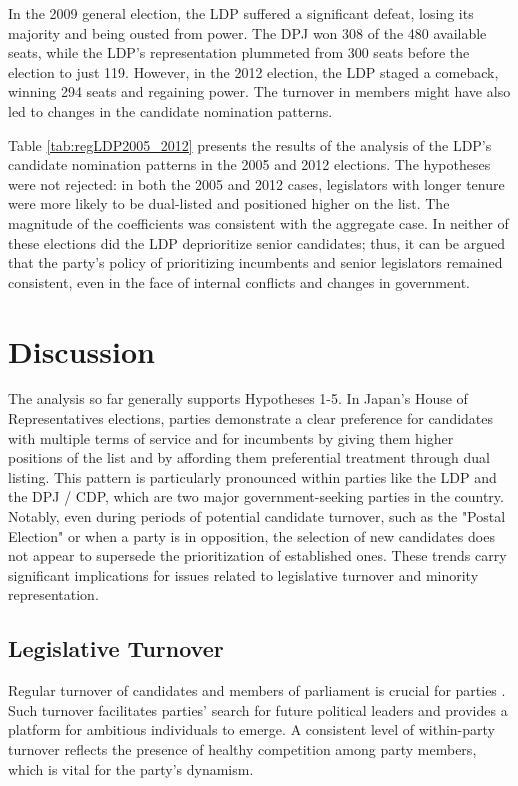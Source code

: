 \documentclass[a4paper, 11pt]{article}
\begin{document}
In the 2009 general election, the LDP suffered a significant defeat, losing its majority and being ousted from power.  The DPJ won 308 of the 480 available seats, while the LDP’s representation plummeted from 300 seats before the election to just 119. However, in the 2012 election, the LDP staged a comeback, winning 294 seats and regaining power. The turnover in members might have also led to changes in the candidate nomination patterns. 

Table \ref{tab:regLDP2005_2012} presents the results of the analysis of the LDP’s candidate nomination patterns in the 2005 and 2012 elections. The hypotheses were not rejected: in both the 2005 and 2012 cases, legislators with longer tenure were more likely to be dual-listed and positioned higher on the list. The magnitude of the coefficients was consistent with the aggregate case. In neither of these elections did the LDP deprioritize senior candidates; thus, it can be argued that the party's policy of prioritizing incumbents and senior legislators remained consistent, even in the face of internal conflicts and changes in government.



\section{Discussion} \label{sec: dis}

The analysis so far generally supports Hypotheses 1-5. In Japan's House of Representatives elections, parties demonstrate a clear preference for candidates with multiple terms of service and for incumbents by giving them higher positions of the list and by affording them preferential treatment through dual listing. This pattern is particularly pronounced within parties like the LDP and the DPJ / CDP, which are two major government-seeking parties in the country. Notably, even during periods of potential candidate turnover, such as the "Postal Election" or when a party is in opposition, the selection of new candidates does not appear to supersede the prioritization of established ones. These trends carry significant implications for issues related to legislative turnover and minority representation.

\subsection{Legislative Turnover}

Regular turnover of candidates and members of parliament is crucial for parties \citep{matland_determinants_2004}. Such turnover facilitates parties' search for future political leaders and provides a platform for ambitious individuals to emerge. A consistent level of within-party turnover reflects the presence of healthy competition among party members, which is vital for the party's dynamism.
\end{document}
